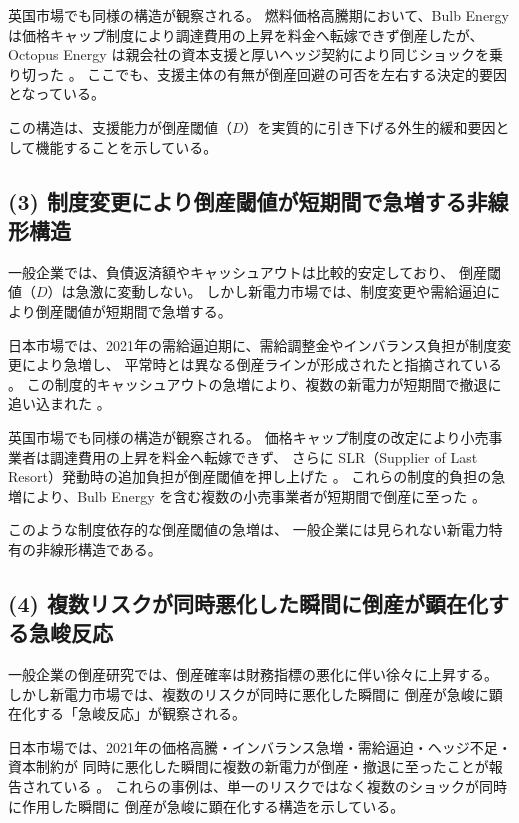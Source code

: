 英国市場でも同様の構造が観察される。
燃料価格高騰期において、Bulb Energy は価格キャップ制度により調達費用の上昇を料金へ転嫁できず倒産したが、
Octopus Energy は親会社の資本支援と厚いヘッジ契約により同じショックを乗り切った
\parencite{Ofgem2021BulbSLR,Ofgem2021OctopusTakeover,UKGov2021BulbSupport}。
ここでも、支援主体の有無が倒産回避の可否を左右する決定的要因となっている。

この構造は、支援能力が倒産閾値（$D$）を実質的に引き下げる外生的緩和要因として機能することを示している。

\subsection*{(3) 制度変更により倒産閾値が短期間で急増する非線形構造}

一般企業では、負債返済額やキャッシュアウトは比較的安定しており、
倒産閾値（$D$）は急激に変動しない。
しかし新電力市場では、制度変更や需給逼迫により倒産閾値が短期間で急増する。

日本市場では、2021年の需給逼迫期に、需給調整金やインバランス負担が制度変更により急増し、
平常時とは異なる倒産ラインが形成されたと指摘されている
\parencite{METI2021AdjustmentFee,OCCTO2021ImbalanceReform}。
この制度的キャッシュアウトの急増により、複数の新電力が短期間で撤退に追い込まれた
\parencite{TDB2021PowerCrisis,TSR2021PowerCrisis}。

英国市場でも同様の構造が観察される。
価格キャップ制度の改定により小売事業者は調達費用の上昇を料金へ転嫁できず、
さらに SLR（Supplier of Last Resort）発動時の追加負担が倒産閾値を押し上げた
\parencite{Ofgem2021PriceCapUpdate,BEIS2021PriceCapReview}。
これらの制度的負担の急増により、Bulb Energy を含む複数の小売事業者が短期間で倒産に至った
\parencite{Ofgem2021BulbSLR,NAO2022SupplierFailures}。

このような制度依存的な倒産閾値の急増は、
一般企業には見られない新電力特有の非線形構造である。

\subsection*{(4) 複数リスクが同時悪化した瞬間に倒産が顕在化する急峻反応}

一般企業の倒産研究では、倒産確率は財務指標の悪化に伴い徐々に上昇する。
しかし新電力市場では、複数のリスクが同時に悪化した瞬間に
倒産が急峻に顕在化する「急峻反応」が観察される。

日本市場では、2021年の価格高騰・インバランス急増・需給逼迫・ヘッジ不足・資本制約が
同時に悪化した瞬間に複数の新電力が倒産・撤退に至ったことが報告されている
\parencite{TDB2021PowerCrisis,TSR2021PowerCrisis}。
これらの事例は、単一のリスクではなく複数のショックが同時に作用した瞬間に
倒産が急峻に顕在化する構造を示している。

